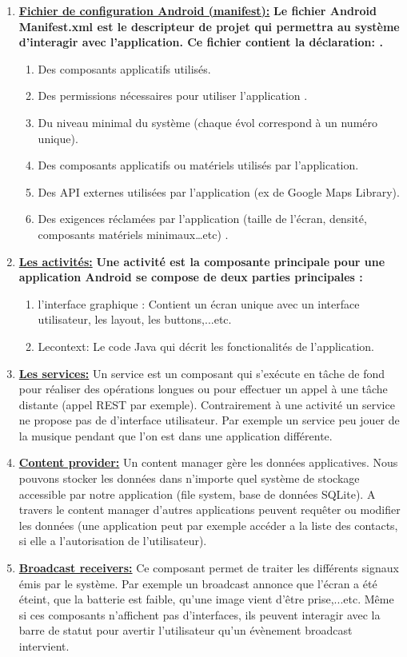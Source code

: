 \documentclass[french,a4,12pt]{report}
\begin{document}
\begin{enumerate}[label=\textcolor{blue}{$\rhd$}]
	\item{ \underline{ \textbf{Fichier de configuration Android (manifest):}}}
	\textbf{Le fichier Android Manifest.xml est le descripteur de projet qui permettra au système d'interagir avec l'application. Ce fichier contient la déclaration: .}\\
	\begin{enumerate}[label=\textcolor{blue}{$\rhd\rhd$}] 
		\item Des composants applicatifs utilisés.
		\item Des permissions nécessaires pour utiliser l'application .
		\item Du niveau minimal du système (chaque évol correspond à un numéro unique). 
		\item Des composants applicatifs ou matériels utilisés par l'application. 
		\item Des API externes utilisées par l'application (ex de Google Maps Library). 
		\item Des exigences réclamées par l'application (taille de l'écran, densité, composants matériels minimaux…etc) .
	\end{enumerate}
	\item{ \underline{ \textbf{Les activités:}}}
	\textbf{Une activité est la composante principale pour une application Android se compose de deux parties principales :}
		\begin{enumerate}[label=\textcolor{blue}{$\rhd\rhd$}] 
		\item l'interface graphique :
		Contient un écran unique avec un interface utilisateur, les layout, les buttons,...etc.
		\item Lecontext: Le code Java qui décrit les fonctionalités de l'application.
	\end{enumerate}	
		\item{ \underline{ \textbf{Les services:}}}
		Un service est un composant qui s'exécute en tâche de fond pour réaliser des opérations longues ou pour effectuer un appel à une tâche distante (appel REST par exemple). Contrairement à une activité un service ne propose pas de d'interface utilisateur. Par exemple un service peu jouer de la musique pendant que l'on est dans une application différente. 
			\item{ \underline{ \textbf{Content provider:}}}
			Un content manager gère les données applicatives. Nous pouvons stocker les données dans n'importe quel système de stockage accessible par notre application (file system, base de données SQLite). A travers le content manager d'autres applications peuvent requêter ou modifier les données (une application peut par exemple accéder a la liste des contacts, si elle a l'autorisation de l'utilisateur). 
				\item{ \underline{ \textbf{Broadcast receivers:}}}
				Ce composant permet de traiter les différents signaux émis par le système. Par exemple un broadcast annonce que l'écran a été éteint, que la batterie est faible, qu'une image vient d'être prise,...etc. Même si ces composants n'affichent pas d'interfaces, ils peuvent interagir avec la barre de statut pour avertir l'utilisateur qu'un évènement broadcast intervient. 
\end{enumerate}
\end{document}
